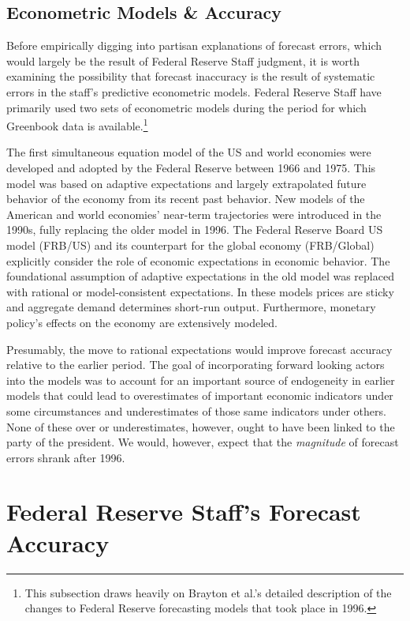 \documentclass[a4paper]{article}\usepackage{graphicx, color}
\begin{document}
\subsection{Econometric Models \& Accuracy}

Before empirically digging into partisan explanations of forecast errors, which would largely be the result of Federal Reserve Staff judgment, it is worth examining the possibility that forecast inaccuracy is the result of systematic errors in the staff's predictive econometric models. Federal Reserve Staff have primarily used two sets of econometric models during the period for which Greenbook data is available.\footnote{This subsection draws heavily on Brayton et al.'s \citeyear{Brayton1997} detailed description of the changes to Federal Reserve forecasting models that took place in 1996.} 

The first simultaneous equation model of the US and world economies were developed and adopted by the Federal Reserve between 1966 and 1975. This model was based on adaptive expectations and largely extrapolated future behavior of the economy from its recent past behavior. New models of the American and world economies' near-term trajectories were introduced in the 1990s, fully replacing the older model in 1996. The Federal Reserve Board US model (FRB/US) and its counterpart for the global economy (FRB/Global) explicitly consider the role of economic expectations in economic behavior. The foundational assumption of adaptive expectations in the old model was replaced with rational or model-consistent expectations. In these models prices are sticky and aggregate demand determines short-run output. Furthermore, monetary policy's effects on the economy are extensively modeled. 

Presumably, the move to rational expectations would improve forecast accuracy relative to the earlier period. The goal of incorporating forward looking actors into the models was to account for an important source of endogeneity in earlier models that could lead to overestimates of important economic indicators under some circumstances and underestimates of those same indicators under others. None of these over or underestimates, however, ought to have been linked to the party of the president. We would, however, expect that the \emph{magnitude} of forecast errors shrank after 1996.
 


\section{Federal Reserve Staff's Forecast Accuracy}\label{ForecastAcc}
\end{document}
